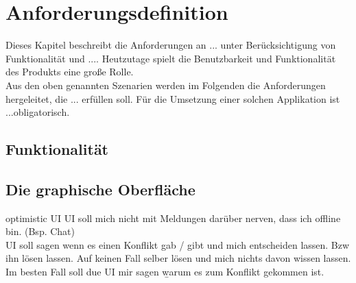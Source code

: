 \chapter{\label{chap:anforderungen}Anforderungsdefinition}
Dieses Kapitel beschreibt die Anforderungen an ... unter Berücksichtigung von Funktionalität und ....
Heutzutage spielt die Benutzbarkeit und Funktionalität des Produkts eine große Rolle.\\
Aus den oben genannten Szenarien werden im Folgenden die Anforderungen hergeleitet, die ... erfüllen soll.
Für die Umsetzung einer solchen Applikation ist ...obligatorisch.
%
%

%
%
\section{Funktionalität}
%
%
\section{Die graphische Oberfläche}
\Gls{optimistic UI}
\gls{UI} soll mich nicht mit Meldungen darüber nerven, dass ich offline bin. (Bsp. Chat)\\
\gls{UI} soll sagen wenn es einen Konflikt gab / gibt und mich entscheiden lassen. Bzw ihn lösen lassen.
Auf keinen Fall selber lösen und mich nichts davon wissen lassen.\\
Im besten Fall soll due UI mir sagen \b{warum} es zum Konflikt gekommen ist.